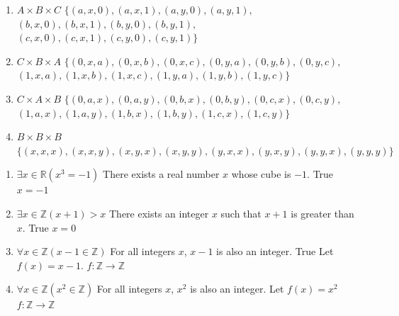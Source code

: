 \documentclass[12pt]{article}  %
\newcommand{\IMPLIES}{\rightarrow}
\begin{document}
\newline
{}
\begin{enumerate}
    \item $A\times B\times C$\newline
        $\{(a,x,0),(a,x,1),(a,y,0),(a,y,1),$\newline
        $(b,x,0),(b,x,1),(b,y,0),(b,y,1),$\newline
        $(c,x,0),(c,x,1),(c,y,0),(c,y,1)\}$
        
    \item $C\times B\times A$\newline
        $\{(0,x,a),(0,x,b),(0,x,c),(0,y,a),(0,y,b),(0,y,c),$\newline
        $(1,x,a),(1,x,b),(1,x,c),(1,y,a),(1,y,b),(1,y,c)\}$
    \item $C\times A\times B$\newline
        $\{(0,a,x),(0,a,y),(0,b,x),(0,b,y),(0,c,x),(0,c,y),$\newline
        $(1,a,x),(1,a,y),(1,b,x),(1,b,y),(1,c,x),(1,c,y)\}$
    \item $B\times B\times B$\newline
        $\{(x,x,x),(x,x,y),(x,y,x),(x,y,y),(y,x,x),(y,x,y),(y,y,x),(y,y,y)\}$
\end{enumerate}

\clearpage

\newline
{}
\begin{enumerate}
    \item $\exists x\in\mathbb{R}(x^3=-1)$\newline
        There exists a real number $x$ whose cube is $-1$.\newline
        True $x=-1$
    \item $\exists x\in\mathbb{Z}(x+1)>x$\newline
        There exists an integer $x$ such that $x+1$ is greater than $x$.\newline
        True $x=0$
    \item $\forall x\in\mathbb{Z}(x-1\in\mathbb{Z})$\newline
        For all integers $x$, $x-1$ is also an integer.\newline
        True\newline
        Let $f(x)=x-1$.\newline
        $f:\mathbb{Z}\IMPLIES\mathbb{Z}$
    \item $\forall x\in\mathbb{Z}(x^2\in\mathbb{Z})$\newline
        For all integers $x$, $x^2$ is also an integer.\newline
        Let $f(x)=x^2$\newline
        $f:\mathbb{Z}\IMPLIES\mathbb{Z}$
\end{enumerate}
\clearpage
\end{document}
